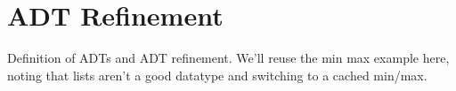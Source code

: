 \section{ADT Refinement}

Definition of ADTs and ADT refinement. We'll reuse the min max example
here, noting that lists aren't a good datatype and switching to a
cached min/max.
